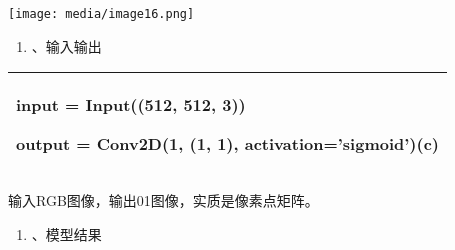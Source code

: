 \texttt{[image: media/image16.png]}

\begin{enumerate}
\def\labelenumi{\arabic{enumi}.}
\item
  、输入输出
\end{enumerate}

\begin{longtable}[]{@{}l@{}}
\toprule
\begin{minipage}[t]{0.97\columnwidth}\raggedright\strut
input = Input((512, 512, 3))

output = Conv2D(1, (1, 1), activation=\textbf{'sigmoid'})(c)\strut
\end{minipage}\tabularnewline
\bottomrule
\end{longtable}

输入RGB图像，输出01图像，实质是像素点矩阵。

\begin{enumerate}
\def\labelenumi{\arabic{enumi}.}
\item
  、模型结果
\end{enumerate}

